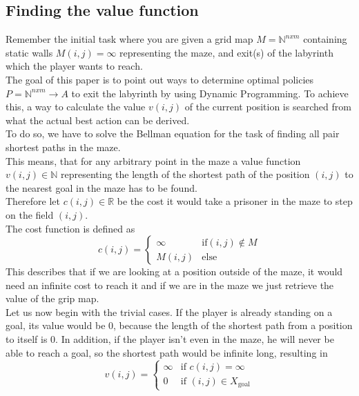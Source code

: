 \documentclass[conference]{IEEEtran}
\begin{document}
\subsection{Finding the value function}
Remember the initial task where you are given a grid map $M=\mathbb{N}^{nxm}$ containing static walls $M(i,j)=\infty$ representing the maze, and exit(s) of the labyrinth which the player wants to reach.\\
The goal of this paper is to point out ways to determine optimal policies $P=\mathbb{N}^{nxm}\rightarrow A$ to exit the labyrinth by using Dynamic Programming. To achieve this, a way to calculate the value $v(i,j)$ of the current position is searched from what the actual best action can be derived.\\
To do so, we have to solve the Bellman equation for the task of finding all pair shortest paths in the maze.\\
This means, that for any arbitrary point in the maze a value function $v(i,j)\in \mathbb{N}$
representing the length of the shortest path of the position $(i, j)$ to the nearest goal in the maze has to be found.\\
Therefore let $c(i,j) \in \mathbb{R}$ be the cost it would take a prisoner in the maze to step on the field $(i,j)$.\\
The cost function is defined as
\begin{equation}
c(i,j) = 
\begin{cases}
	\infty & \text{if} (i,j) \notin M\\
	M(i,j) & \text{else}
	\end{cases}
\end{equation}
This describes that if we are looking at a position outside of the maze, it would need an infinite cost to reach it and if we are in the maze we just retrieve the value of the grip map. \\
Let us now begin with the trivial cases.
If the player is already standing on a goal, its value would be $0$, because the length of the shortest path from a position to itself is $0$.
In addition, if the player isn't even in the maze, he will never be able to reach a goal, so the shortest path would be infinite long, resulting in
\begin{equation}
v(i,j) = 
  \begin{cases}	
	\infty & \text{if } c(i,j) = \infty \\
	0 & \text{if } (i,j) \in X_\text{goal}
  \end{cases}
\end{equation}
\end{document}
